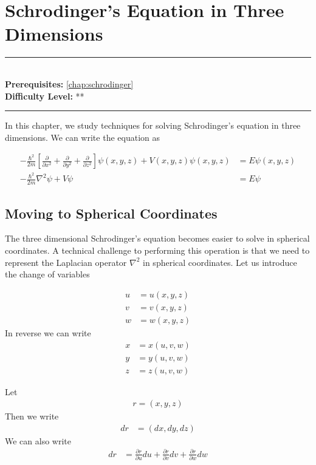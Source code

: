 \documentclass[book.tex]{subfiles}
\begin{document}
\chapter{Schrodinger's Equation in Three Dimensions}

\label{chap:schrodinger_3D}
\noindent\rule{11cm}{0.4pt} \\
\textbf{Prerequisites:}  \autoref{chap:schrodinger} \\
\textbf{Difficulty Level:} ** \\
\noindent\rule{11cm}{0.4pt}
\vspace{5mm}

In this chapter, we study techniques for solving Schrodinger's equation in three dimensions. We can write the equation as

\begin{align}
-\frac{\hbar^2}{2m}\left [ \frac{\partial}{\partial x^2} + \frac{\partial}{\partial y^2} + \frac{\partial}{\partial z^2}\right ] \psi(x, y, z) + V(x, y, z) \psi(x, y,z) &= E \psi(x, y, z) \\
-\frac{\hbar^2}{2m} \nabla^2 \psi + V \psi &= E \psi
\end{align}

\section{Moving to Spherical Coordinates}
The three dimensional Schrodinger's equation becomes easier to solve in spherical coordinates. A technical challenge to performing this operation is that we need to represent the Laplacian operator $\nabla^2$ in spherical coordinates. Let us introduce the change of variables


\begin{align}
    u &= u(x, y, z) \\
    v &= v(x, y, z) \\
    w &= w(x, y, z)
\end{align}
In reverse we can write
\begin{align}
    x &= x(u, v, w) \\
    y &= y(u, v, w) \\
    z &= z(u, v, w)
\end{align}

Let 
\begin{align}
    r = (x, y, z)
\end{align}
Then we write
\begin{align}
    dr &= (dx, dy, dz)
\end{align}
We can also write
\begin{align}
    dr &= \frac{\partial r}{\partial u} du + \frac{\partial r}{\partial v} dv + \frac{\partial r}{\partial w} dw
\end{align}
\end{document}
